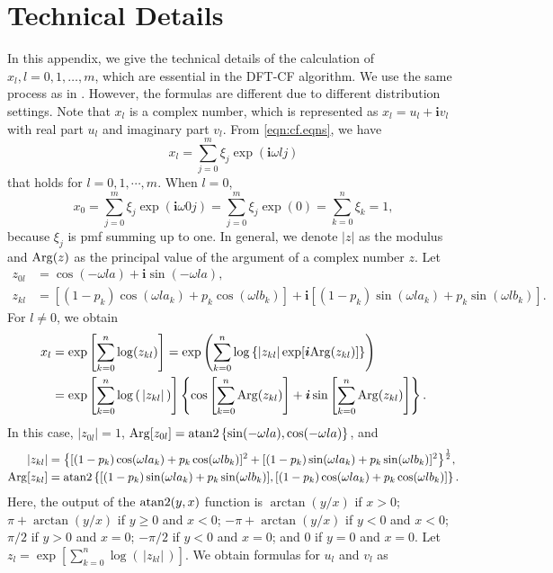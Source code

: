 \documentclass[12pt]{article}
\newcommand{\Arg}{{\rm Arg}}
\newcommand{\atantwo}{{\rm atan2}}
\newcommand{\ivec}{{\boldsymbol{i}}}
\begin{document}
\section{Technical Details}
In this appendix, we give the technical details of the calculation of $x_l, l=0,1,\dots,m$, which are essential in the DFT-CF algorithm. We use the same process as in . However, the formulas are different due to different distribution settings. Note that $x_l$ is a complex number, which is represented as $x_l=u_l+\ivec v_l$ with real part $u_l$ and imaginary part $v_l$. From \eqref{eqn:cf.eqns}, we have $$x_l=\sum_{j=0}^m\xi_j\exp(\ivec\omega lj)$$
that holds for $l=0,1,\cdots, m$. When $l=0$,
$$x_0=\sum_{j=0}^m\xi_j\exp(\ivec\omega 0j)=\sum_{j=0}^m\xi_j\exp(0)=\sum_{k=0}^n\xi_k=1,$$
because $\xi_j$ is pmf summing up to one. In general, we denote $|z|$ as the modulus and $\Arg(z)$ as the principal value of the argument of a complex number $z$. Let
\begin{align*}
z_{0l}&=\cos(-\omega la)+\ivec\sin(-\omega la),\\
z_{kl}&=[(1-p_k)\cos(\omega la_k)+p_k\cos(\omega lb_k)]+\ivec[(1-p_k)\sin(\omega la_k)+p_k\sin(\omega lb_k)].
\end{align*}
For $l\neq0$, we obtain
\begin{align*}
x_l&= \exp\left[\sum_{k=0}^n\log(z_{kl})\right]=\exp\left(\sum_{k=0}^n\log\left\{|z_{kl}|\exp[\ivec \Arg(z_{kl})]\right\}\right)\\
&=\exp\left[\sum_{k=0}^n\log\left(\,|z_{kl}|\,\right)\right]\left\{\cos\left[\sum_{k=0}^n\Arg(z_{kl})\right]
+\ivec\sin\left[\sum_{k=0}^n\Arg(z_{kl})\right]\right\}.
\end{align*}
In this case, $|z_{0l}|=1$, $\Arg[z_{0l}]=\atantwo\left\{\sin(-\omega la), \cos(-\omega la)\right\}$, and
\begin{align*}
|z_{kl}|&=\big\{[(1-p_k)\cos(\omega la_k)+p_k\cos(\omega lb_k)]^2+[(1-p_k)\sin(\omega la_k)+p_k\sin(\omega lb_k)]^2\big\}^{\frac{1}{2}},\\
\Arg[z_{kl}]&=\atantwo\left\{[(1-p_k)\sin(\omega la_k)+p_k\sin(\omega lb_k)], [(1-p_k)\cos(\omega la_k)+p_k\cos(\omega lb_k)]\right\}.
\end{align*}
Here, the output of the $\atantwo (y,x)$ function is $\arctan(y/x)$ if $x > 0$; $\pi + \arctan(y/x)$ if $y \ge 0$ and $x < 0$; $-\pi + \arctan(y/x)$ if $y < 0$ and $x < 0$; $\pi/2$ if $y > 0$ and $x = 0$; $-\pi/2$ if $y < 0$ and $x = 0$; and 0 if  $y = 0$ and $x = 0$. Let $z_l=\exp\left[\sum_{k=0}^n\log\left(\,|z_{kl}|\,\right)\right]$. We obtain formulas for $u_l$ and $v_l$ as
\end{document}
